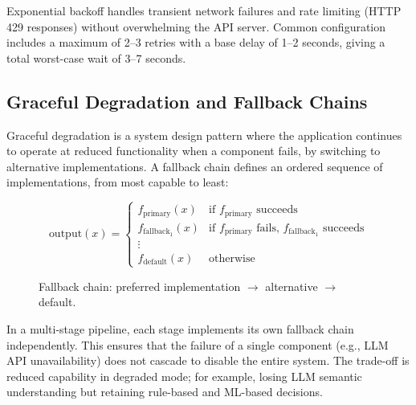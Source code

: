 \documentclass[10pt,a4paper]{article}
\begin{document}
Exponential backoff handles transient network failures and rate limiting (HTTP 429 responses) without overwhelming the API server. Common configuration includes a maximum of 2--3 retries with a base delay of 1--2 seconds, giving a total worst-case wait of 3--7 seconds.

\subsection{Graceful Degradation and Fallback Chains}
\label{sec:graceful-degradation}

Graceful degradation is a system design pattern where the application continues to operate at reduced functionality when a component fails, by switching to alternative implementations. A fallback chain defines an ordered sequence of implementations, from most capable to least:

\begin{equation}
\text{output}(x) = \begin{cases}
f_{\text{primary}}(x) & \text{if } f_{\text{primary}} \text{ succeeds} \\
f_{\text{fallback}_1}(x) & \text{if } f_{\text{primary}} \text{ fails, } f_{\text{fallback}_1} \text{ succeeds} \\
\vdots & \\
f_{\text{default}}(x) & \text{otherwise}
\end{cases}
\label{eq:fallback-chain}
\end{equation}

\begin{figure}[H]
    \centering
    \caption{Fallback chain: preferred implementation $\rightarrow$ alternative $\rightarrow$ default.}
    \label{fig:fallback-chain}
\end{figure}

In a multi-stage pipeline, each stage implements its own fallback chain independently. This ensures that the failure of a single component (e.g., LLM API unavailability) does not cascade to disable the entire system. The trade-off is reduced capability in degraded mode; for example, losing LLM semantic understanding but retaining rule-based and ML-based decisions.

\end{document}
